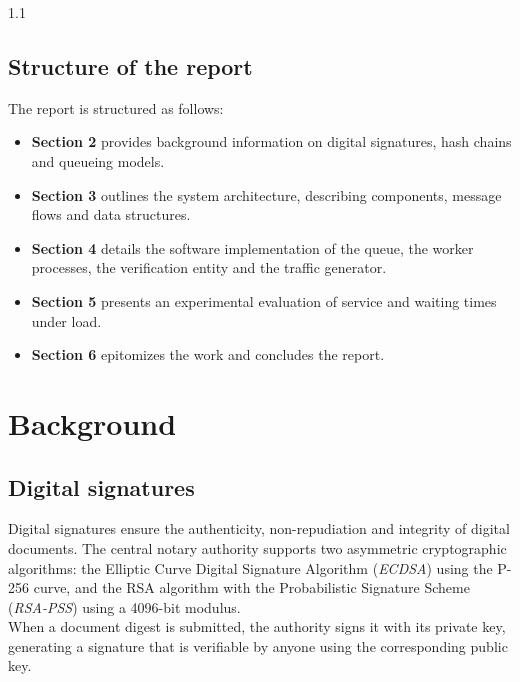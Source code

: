 \documentclass[11pt,a4paper]{article}
\begin{document}
\begin{spacing}{1.1}
\subsection{Structure of the report}
The report is structured as follows:
\begin{itemize}
\item{\textbf{Section 2} provides background information on digital signatures, hash chains and queueing models.}
\item{\textbf{Section 3} outlines the system architecture, describing components, message flows and data structures.}
\item {\textbf{Section 4} details the software implementation of the queue, the worker processes, the verification entity and the traffic generator.}
\item {\textbf{Section 5} presents an experimental evaluation of service and waiting times under load.}
\item {\textbf{Section 6} epitomizes the work and concludes the report.}
\end{itemize}
\pagebreak

\section{Background}

\subsection{Digital signatures}
Digital signatures ensure the authenticity, non-repudiation and integrity of digital documents. The central notary authority supports two asymmetric cryptographic algorithms: the Elliptic Curve Digital Signature Algorithm (\textit{ECDSA}) using the P-256 curve, and the RSA algorithm with the Probabilistic Signature Scheme (\textit{RSA-PSS}) using a 4096-bit modulus.
\\When a document digest is submitted, the authority signs it with its private key, generating a signature that is verifiable by anyone using the corresponding public key.


\end{spacing}
\end{document}
